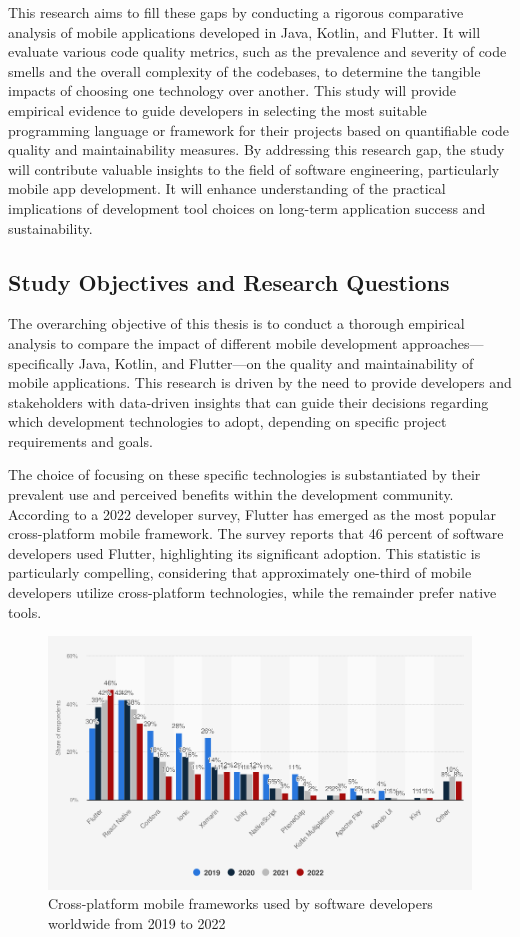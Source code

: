 \par
This research aims to fill these gaps by conducting a rigorous comparative analysis of mobile applications developed in Java, Kotlin, and Flutter. It will evaluate various code quality metrics, such as the prevalence and severity of code smells and the overall complexity of the codebases, to determine the tangible impacts of choosing one technology over another. This study will provide empirical evidence to guide developers in selecting the most suitable programming language or framework for their projects based on quantifiable code quality and maintainability measures. By addressing this research gap, the study will contribute valuable insights to the field of software engineering, particularly mobile app development. It will enhance understanding of the practical implications of development tool choices on long-term application success and sustainability.
\subsection{Study Objectives and Research Questions}
The overarching objective of this thesis is to conduct a thorough empirical analysis to compare the impact of different mobile development approaches—specifically Java, Kotlin, and Flutter—on the quality and maintainability of mobile applications. This research is driven by the need to provide developers and stakeholders with data-driven insights that can guide their decisions regarding which development technologies to adopt, depending on specific project requirements and goals. 
\par
The choice of focusing on these specific technologies is substantiated by their prevalent use and perceived benefits within the development community. According to a 2022 developer survey, Flutter has emerged as the most popular cross-platform mobile framework. The survey reports that 46 percent of software developers used Flutter, highlighting its significant adoption. This statistic is particularly compelling, considering that approximately one-third of mobile developers utilize cross-platform technologies, while the remainder prefer native tools.
\begin{figure}[htbp]
    \centering
    \includegraphics[scale = 0.45]{img/cross_platform-sts.png}
    \caption{Cross-platform mobile frameworks used by software developers worldwide from 2019 to 2022 \cite{jetbrains2022}}
    \label{fig:cross_platform-sts}
\end{figure}
